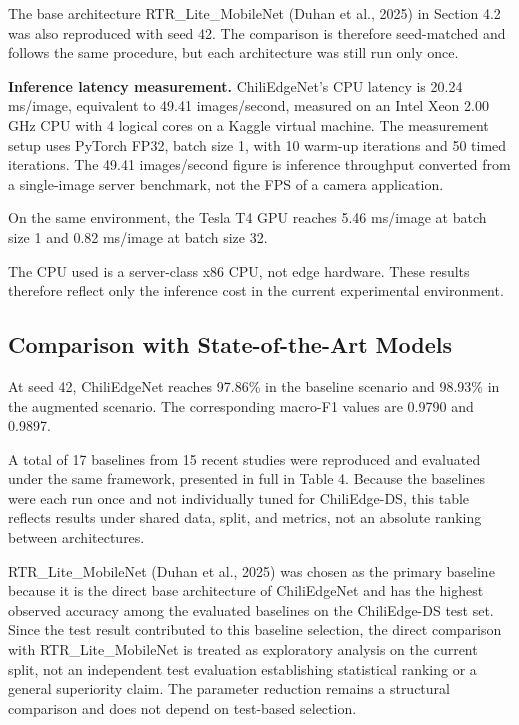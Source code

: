 The base architecture RTR\_Lite\_MobileNet (Duhan et al., 2025) in Section 4.2 was also reproduced with seed 42. The comparison is therefore seed-matched and follows the same procedure, but each architecture was still run only once.

\textbf{Inference latency measurement.} ChiliEdgeNet's CPU latency is 20.24 ms/image, equivalent to 49.41 images/second, measured on an Intel Xeon 2.00 GHz CPU with 4 logical cores on a Kaggle virtual machine. The measurement setup uses PyTorch FP32, batch size 1, with 10 warm-up iterations and 50 timed iterations. The 49.41 images/second figure is inference throughput converted from a single-image server benchmark, not the FPS of a camera application.

On the same environment, the Tesla T4 GPU reaches 5.46 ms/image at batch size 1 and 0.82 ms/image at batch size 32.

The CPU used is a server-class x86 CPU, not edge hardware. These results therefore reflect only the inference cost in the current experimental environment.

\subsection{Comparison with State-of-the-Art Models}\label{comparison-with-state-of-the-art-models}

At seed 42, ChiliEdgeNet reaches 97.86\% in the baseline scenario and 98.93\% in the augmented scenario. The corresponding macro-F1 values are 0.9790 and 0.9897.

A total of 17 baselines from 15 recent studies were reproduced and evaluated under the same framework, presented in full in Table 4. Because the baselines were each run once and not individually tuned for ChiliEdge-DS, this table reflects results under shared data, split, and metrics, not an absolute ranking between architectures.

RTR\_Lite\_MobileNet (Duhan et al., 2025) was chosen as the primary baseline because it is the direct base architecture of ChiliEdgeNet and has the highest observed accuracy among the evaluated baselines on the ChiliEdge-DS test set. Since the test result contributed to this baseline selection, the direct comparison with RTR\_Lite\_MobileNet is treated as exploratory analysis on the current split, not an independent test evaluation establishing statistical ranking or a general superiority claim. The parameter reduction remains a structural comparison and does not depend on test-based selection.

